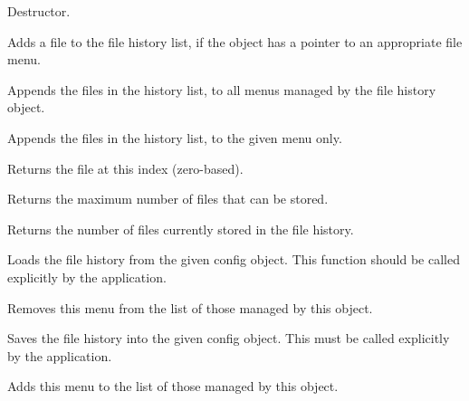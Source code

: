
Destructor.



Adds a file to the file history list, if the object has a pointer to an appropriate file menu.

\label{wxfilehistoryaddfilestomenu}


Appends the files in the history list, to all menus managed by the file history object.


Appends the files in the history list, to the given menu only.

\label{wxfilehistorygethistoryfile}


Returns the file at this index (zero-based).



Returns the maximum number of files that can be stored.



Returns the number of files currently stored in the file history.



Loads the file history from the given config object. This function should be called explicitly by the application.





Removes this menu from the list of those managed by this object.



Saves the file history into the given config object. This must be called
explicitly by the application.





Adds this menu to the list of those managed by this object.


